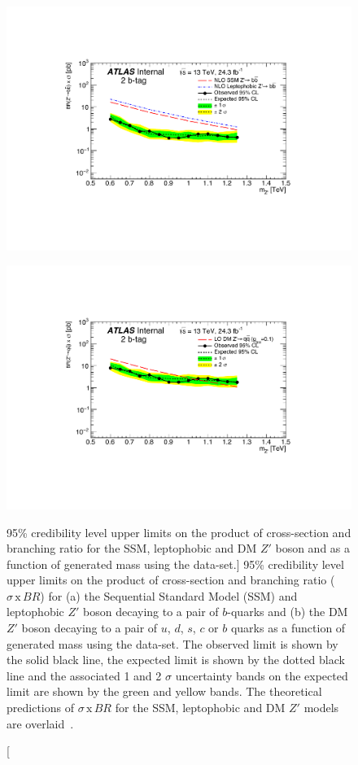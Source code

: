 \begin{figure}[!ht]
  \centering
  \captionsetup[subfigure]{aboveskip=0pt,justification=centering}
   {\includegraphics[width=0.9\linewidth, angle=0]{figs/Dibjet/LowMass/lim-zprime_SSM_BR.pdf}\vspace{-4pt}}
  
                    {\includegraphics[width=0.9\linewidth, angle=0]{figs/Dibjet/LowMass/lim-zprime_DM_BR.pdf}}
  \caption
      [95\% credibility level upper limits on the product of cross-section and branching ratio 
        for the SSM, leptophobic and DM $Z'$ boson and as a function of generated mass using the \lm{} data-set.]
      {95\% credibility level upper limits on the product of
        cross-section and branching ratio ($\sigma\,\text{x}\,\mathit{BR}$)
        for (a) the Sequential Standard Model (SSM) and leptophobic $Z'$ boson decaying to a pair of $b$-quarks
        and (b) the DM $Z'$ boson decaying to a pair of $u$, $d$, $s$, $c$ or $b$ quarks
        as a function of generated mass using the \lm{} data-set.
        The observed limit is shown by the solid black line, the expected limit is shown by the dotted black line
        and the associated 1 and 2 $\sigma$ uncertainty bands on the expected limit are shown by the green and yellow bands.
        The theoretical predictions of $\sigma\,\text{x}\,\mathit{BR}$
        for the  SSM, leptophobic and DM $Z'$ models are overlaid~\cite{dibjet-full_int}.
      }
  \label{fig:lim-lowmass_benchmark}
\end{figure}

